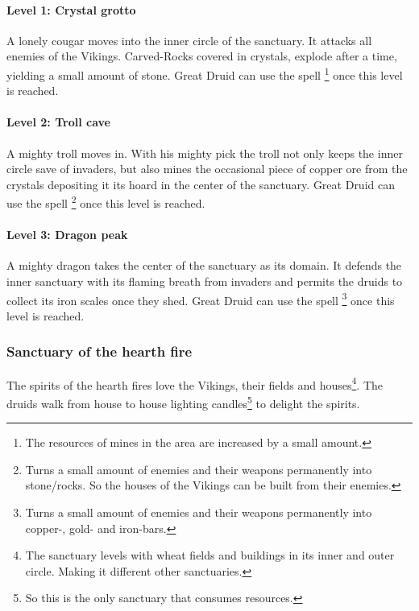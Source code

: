 \paragraph{Level 1: Crystal grotto}
A lonely cougar moves into the inner circle of the sanctuary. It attacks all
enemies of the \gls{Vikings}. Carved-Rocks covered in crystals, explode after a
time, yielding a small amount of stone. Great Druid can use the spell
\footnote{ The resources of mines in the
	area are increased by a small amount. } once this level is reached.

\paragraph{Level 2: Troll cave}
A mighty troll moves in. With his mighty pick the troll not only keeps the
inner circle save of invaders, but also mines the occasional piece of copper
ore from the crystals depositing it its hoard in the center of the sanctuary.
Great Druid can use the spell \footnote{ Turns a
	small amount of enemies and their weapons permanently into stone/rocks. So the
	houses of the \gls{Vikings} can be built from their enemies. } once this level
is reached.

\paragraph{Level 3: Dragon peak}
A mighty dragon takes the center of the sanctuary as its domain. It defends the
inner sanctuary with its flaming breath from invaders and permits the druids to
collect its iron scales once they shed. Great Druid can use the spell
\footnote{ Turns a small amount of enemies and their
	weapons permanently into copper-, gold- and iron-bars. } once this level is
reached.

\subsubsection{Sanctuary of the hearth fire}\label{ch:Tribes:Vikings:Religion:City}
The spirits of the hearth fires love the \gls{Vikings}, their fields and
houses\footnote{ The sanctuary levels with wheat fields and buildings in its
	inner and outer circle. Making it different other sanctuaries. }. The druids
walk from house to house lighting candles\footnote{ So this is the only
	sanctuary that consumes resources. } to delight the spirits.

